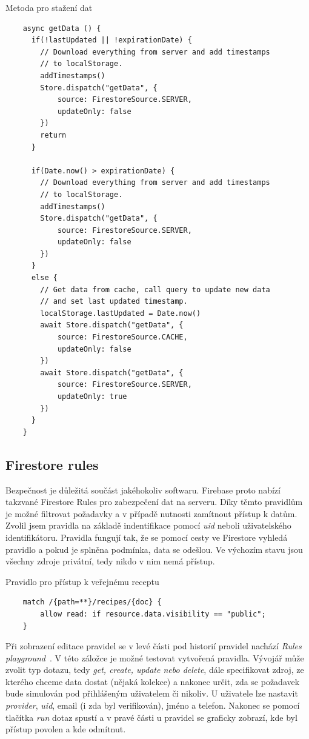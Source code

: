 \begin{listing}[H]
    \caption{Metoda pro stažení dat}
    \begin{verbatim}
    async getData () {
      if(!lastUpdated || !expirationDate) {
        // Download everything from server and add timestamps
        // to localStorage.
        addTimestamps()
        Store.dispatch("getData", {
            source: FirestoreSource.SERVER,
            updateOnly: false
        })
        return
      }

      if(Date.now() > expirationDate) {
        // Download everything from server and add timestamps
        // to localStorage.
        addTimestamps()
        Store.dispatch("getData", {
            source: FirestoreSource.SERVER,
            updateOnly: false
        })
      }
      else {
        // Get data from cache, call query to update new data
        // and set last updated timestamp.
        localStorage.lastUpdated = Date.now()
        await Store.dispatch("getData", {
            source: FirestoreSource.CACHE,
            updateOnly: false
        })
        await Store.dispatch("getData", {
            source: FirestoreSource.SERVER,
            updateOnly: true
        })
      }
    }
    \end{verbatim}
\end{listing}


\subsection{Firestore rules}
Bezpečnost je důležitá součást jakéhokoliv softwaru. Firebase proto nabízí takzvané Firestore Rules pro zabezpečení dat na serveru.
Díky těmto pravidlům je možné filtrovat požadavky a v případě nutnosti zamítnout přístup k datům. Zvolil jsem pravidla na základě
indentifikace pomocí \emph{uid} neboli uživatelského identifikátoru. Pravidla fungují tak, že se pomocí cesty ve Firestore vyhledá
pravidlo a pokud je splněna podmínka, data se odešlou. Ve výchozím stavu jsou všechny zdroje privátní, tedy nikdo v nim nemá přístup.

\begin{listing}[H]
    \caption{Pravidlo pro přístup k veřejnému receptu}
    \begin{verbatim}
    match /{path=**}/recipes/{doc} {
        allow read: if resource.data.visibility == "public";
    }
    \end{verbatim}
\end{listing}

Při zobrazení editace pravidel se v levé části pod historií pravidel nachází \emph{Rules playground}~\cite{FirebaseRulesPlayground}. V této záložce je možné
testovat vytvořená pravidla. Vývojář může zvolit typ dotazu, tedy \emph{get, create, update \emph{nebo} delete}, dále specifikovat
zdroj, ze kterého chceme data dostat (nějaká kolekce) a nakonec určit, zda se požadavek bude simulován pod přihlášeným uživatelem
či nikoliv. U uživatele lze nastavit \emph{provider}, \emph{uid}, email (i zda byl verifikován), jméno a telefon. Nakonec se pomocí tlačítka
\emph{run} dotaz spustí a v pravé části u pravidel se graficky zobrazí, kde byl přístup povolen a kde odmítnut.


